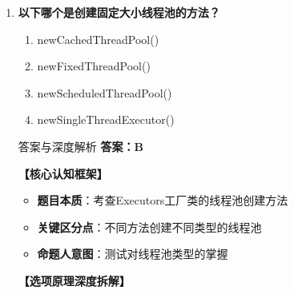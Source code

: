 \documentclass[12pt, a4paper]{ctexart}
\begin{document}
\begin{enumerate}[label=\textbf{\arabic*.}]
\begin{bluebox}{答案与深度解析}
\begin{itemize}[label={}, leftmargin=*, nosep]
		      \end{itemize}

		      \textbf{【应背诵知识点（命题人思维版）】}
		      \begin{enumerate}[label={}, leftmargin=*, nosep]
			      \item \textbf{线程池核心优势}：
			            \begin{itemize}[label={}, nosep]
				            \item 复用线程，减少开销
				            \item 控制并发数量
				            \item 提供任务队列管理
			            \end{itemize}
		      \end{enumerate}

		      \textbf{【命题趋势与实战策略】}

		      \textbf{考场秒杀技巧}：线程池 = 复用 + 控制 + 管理
	      \end{bluebox}

	\item \textbf{以下哪个是创建固定大小线程池的方法？}
	      \begin{enumerate}[label=\Alph*.]
		      \item newCachedThreadPool()
		      \item newFixedThreadPool()
		      \item newScheduledThreadPool()
		      \item newSingleThreadExecutor()
	      \end{enumerate}

	      \begin{bluebox}{答案与深度解析}
		      \textbf{答案：B}

		      \textbf{【核心认知框架】}
		      \begin{itemize}[label={}, leftmargin=*, nosep]
			      \item \textbf{题目本质}：考查Executors工厂类的线程池创建方法
			      \item \textbf{关键区分点}：不同方法创建不同类型的线程池
			      \item \textbf{命题人意图}：测试对线程池类型的掌握
		      \end{itemize}

		      \textbf{【选项原理深度拆解】}
					  \begin{itemize}[label={}, leftmargin=*, nosep]


\end{itemize}
\end{bluebox}
\end{enumerate}
\end{document}

